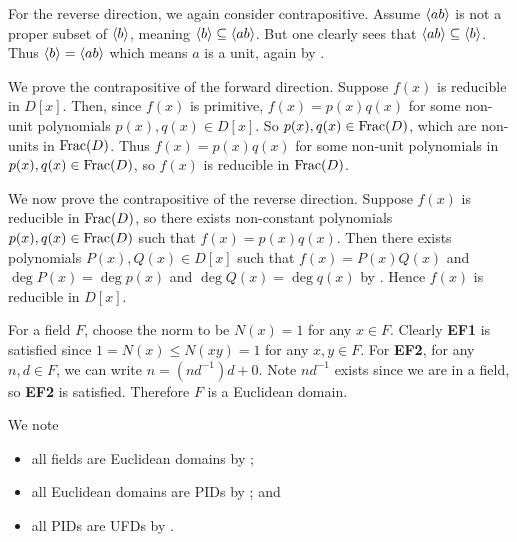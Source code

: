 \begin{questions}
    For the reverse direction, we again consider contrapositive. Assume $\left\langle ab\right\rangle$ is not a proper subset of $\left\langle b\right\rangle$, meaning $\left\langle b\right\rangle \subseteq \left\langle ab\right\rangle$. But one clearly sees that $\left\langle ab\right\rangle \subseteq \left\langle b\right\rangle$. Thus $\left\langle b\right\rangle = \left\langle ab\right\rangle$ which means $a$ is a unit, again by .

    \item We prove the contrapositive of the forward direction. Suppose $f(x)$ is reducible in $D[x]$. Then, since $f(x)$ is primitive, $f(x) = p(x)q(x)$ for some non-unit polynomials $p(x), q(x) \in D[x]$. So $p(x), q(x) \in \mathrm{Frac}(D)$, which are non-units in $\mathrm{Frac}(D)$. Thus $f(x) = p(x)q(x)$ for some non-unit polynomials in $p(x), q(x) \in \mathrm{Frac}(D)$, so $f(x)$ is reducible in $\mathrm{Frac}(D)$.

    We now prove the contrapositive of the reverse direction. Suppose $f(x)$ is reducible in $\mathrm{Frac}(D)$, so there exists non-constant polynomials $p(x), q(x) \in \mathrm{Frac}(D)$ such that $f(x) = p(x)q(x)$. Then there exists polynomials $P(x), Q(x) \in D[x]$ such that $f(x) = P(x)Q(x)$ and $\deg P(x) = \deg p(x)$ and $\deg Q(x) = \deg q(x)$ by . Hence $f(x)$ is reducible in $D[x]$.

    \item For a field $F$, choose the norm to be $N(x) = 1$ for any $x \in F$. Clearly \textbf{EF1} is satisfied since $1 = N(x) \leq N(xy) = 1$ for any $x,y\in F$. For \textbf{EF2}, for any $n, d \in F$, we can write $n = (nd^{-1})d + 0$. Note $nd^{-1}$ exists since we are in a field, so \textbf{EF2} is satisfied. Therefore $F$ is a Euclidean domain.

    \item We note
    \begin{itemize}
        \item all fields are Euclidean domains by ;
        \item all Euclidean domains are PIDs by ; and
        \item all PIDs are UFDs by .
    \end{itemize}
\end{questions}

